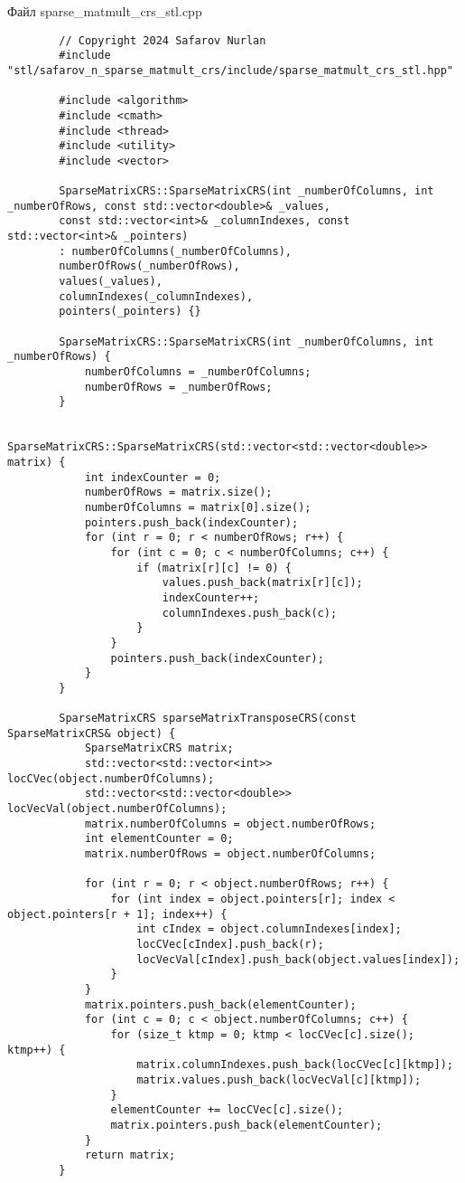 \documentclass[a4paper, 14pt]{article}
\begin{document}
	Файл sparse\_matmult\_crs\_stl.cpp
	\begin{verbatim}
		// Copyright 2024 Safarov Nurlan
		#include "stl/safarov_n_sparse_matmult_crs/include/sparse_matmult_crs_stl.hpp"
		
		#include <algorithm>
		#include <cmath>
		#include <thread>
		#include <utility>
		#include <vector>
		
		SparseMatrixCRS::SparseMatrixCRS(int _numberOfColumns, int _numberOfRows, const std::vector<double>& _values,
		const std::vector<int>& _columnIndexes, const std::vector<int>& _pointers)
		: numberOfColumns(_numberOfColumns),
		numberOfRows(_numberOfRows),
		values(_values),
		columnIndexes(_columnIndexes),
		pointers(_pointers) {}
		
		SparseMatrixCRS::SparseMatrixCRS(int _numberOfColumns, int _numberOfRows) {
			numberOfColumns = _numberOfColumns;
			numberOfRows = _numberOfRows;
		}
		
		SparseMatrixCRS::SparseMatrixCRS(std::vector<std::vector<double>> matrix) {
			int indexCounter = 0;
			numberOfRows = matrix.size();
			numberOfColumns = matrix[0].size();
			pointers.push_back(indexCounter);
			for (int r = 0; r < numberOfRows; r++) {
				for (int c = 0; c < numberOfColumns; c++) {
					if (matrix[r][c] != 0) {
						values.push_back(matrix[r][c]);
						indexCounter++;
						columnIndexes.push_back(c);
					}
				}
				pointers.push_back(indexCounter);
			}
		}
		
		SparseMatrixCRS sparseMatrixTransposeCRS(const SparseMatrixCRS& object) {
			SparseMatrixCRS matrix;
			std::vector<std::vector<int>> locCVec(object.numberOfColumns);
			std::vector<std::vector<double>> locVecVal(object.numberOfColumns);
			matrix.numberOfColumns = object.numberOfRows;
			int elementCounter = 0;
			matrix.numberOfRows = object.numberOfColumns;
			
			for (int r = 0; r < object.numberOfRows; r++) {
				for (int index = object.pointers[r]; index < object.pointers[r + 1]; index++) {
					int cIndex = object.columnIndexes[index];
					locCVec[cIndex].push_back(r);
					locVecVal[cIndex].push_back(object.values[index]);
				}
			}
			matrix.pointers.push_back(elementCounter);
			for (int c = 0; c < object.numberOfColumns; c++) {
				for (size_t ktmp = 0; ktmp < locCVec[c].size(); ktmp++) {
					matrix.columnIndexes.push_back(locCVec[c][ktmp]);
					matrix.values.push_back(locVecVal[c][ktmp]);
				}
				elementCounter += locCVec[c].size();
				matrix.pointers.push_back(elementCounter);
			}
			return matrix;
		}
		

\end{verbatim}
\end{document}
